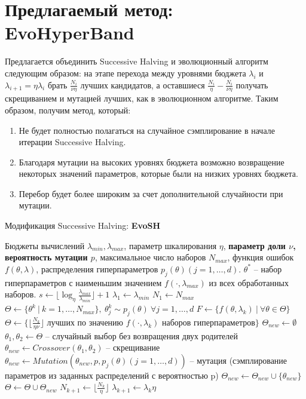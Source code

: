 \documentclass[a4paper,12pt]{article}
\begin{document}
\section{Предлагаемый метод: EvoHyperBand}
Предлагается объединить Successive Halving и эволюционный алгоритм следующим образом: на этапе перехода между уровнями бюджета $\lambda_i$ и $\lambda_{i+1} = \eta\lambda_i$ брать $\frac{N_i}{\nu\eta}$ лучших кандидатов, а оставшиеся $\frac{N_i}{\eta} - \frac{N_i}{\nu\eta}$ получать скрещиванием и мутацией лучших, как в эволюционном алгоритме. Таким образом, получим метод, который:
\begin{enumerate}
    \item Не будет полностью полагаться на случайное сэмплирование в начале итерации Successive Halving.
    \item Благодаря мутации на высоких уровнях бюджета возможно возвращение некоторых значений параметров, которые были  на низких уровнях бюджета.
    \item Перебор будет более широким за счет дополнительной случайности при мутации.
\end{enumerate}

\begin{algorithm}[H]
    \caption{Модификация Successive Halving: \textbf{EvoSH}}\label{alg:esh}
  \begin{algorithmic}[1]
    \INPUT Бюджеты вычислений $\lambda_{min}, \lambda_{max}$, параметр шкалирования $\eta$, \textbf{параметр доли $\nu$, вероятность мутации $p$}, максимальное число наборов $N_{max}$, функция ошибок $f(\theta, \lambda)$, распределения гиперпараметров $p_{j}(\theta) (j = 1,\dots,d)$.
    \OUTPUT $\theta^*$ -- набор гиперпараметров с наименьшим значением $f(\cdot, \lambda_{max})$ из всех обработанных наборов.
    \STATE $s \gets \lfloor \log_{\eta} \frac{\lambda_{max}}{\lambda_{min}} \rfloor + 1$
    \STATE $\lambda_{1} \gets \lambda_{min}$
    \STATE $N_{1} \gets N_{max}$
    \STATE $\Theta \gets \{\theta^k\ |\ k = 1,\dots,N_{max}\},\ \theta^k_j \sim p_j(\theta)\ \forall j = 1,\dots,d$
        \STATE $F \gets \{f(\theta, \lambda_k)\ |\ \forall \theta \in \Theta\}$
        \STATE $\Theta \gets \{\lfloor \frac{N_k}{\eta\nu} \rfloor \text{ лучших по значению } f(\cdot, \lambda_k) \text{ наборов гиперпараметров}\}$
        \STATE $\Theta_{new} \gets \emptyset$
            \STATE $\theta_1, \theta_2 \gets \Theta$ -- случайный выбор без возвращения двух родителей
            \STATE $\theta_{new} \gets Crossover(\theta_1, \theta_2)$ -- скрещивание
            \STATE $\theta_{new} \gets Mutation(\theta_{new}, p, p_{j}(\theta) (j = 1,\dots,d))$ -- мутация (сэмплирование параметров из заданных распределений с вероятностью p)
            \STATE $\Theta_{new} \gets \Theta_{new} \cup \{\theta_{new}\} $
        \ENDWHILE
        \STATE $\Theta \gets \Theta \cup \Theta_{new}$
        \STATE $N_{k+1} \gets \lfloor \frac{N_k}{\eta} \rfloor$
        \STATE $\lambda_{k+1} \gets \lambda_k\eta$
    \ENDFOR
  \end{algorithmic}

\end{algorithm}
\end{document}

